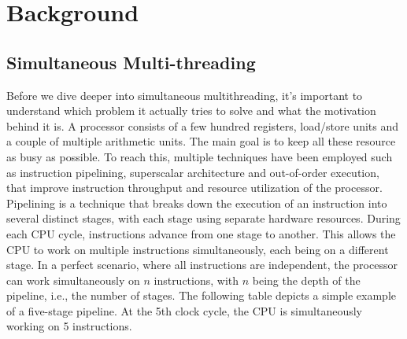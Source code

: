 \chapter{Background}\label{chapter:background}
\section{Simultaneous Multi-threading}
Before we dive deeper into simultaneous multithreading, it's important to understand which problem it actually 
tries to solve and what the motivation behind it is. 
A processor consists of a few hundred registers, load/store units and a couple of multiple arithmetic units. 
The main goal is to keep all these resource as busy as possible. To reach this, multiple techniques have been 
employed such as instruction pipelining, superscalar architecture and out-of-order execution, that improve 
instruction throughput and resource utilization of the processor.
Pipelining is a technique that breaks down the execution of an instruction into several distinct stages, 
with each stage using separate hardware resources. During each CPU cycle, instructions advance from one stage 
to another. This allows the CPU to work on multiple instructions simultaneously, each being on a different 
stage. In a perfect scenario, where all instructions are independent, the processor can work simultaneously 
on \begin{math}n\end{math} instructions, with \begin{math}n\end{math} being the depth of the pipeline, i.e., 
the number of stages. The following table depicts a simple example of a five-stage pipeline. 
At the 5th clock cycle, the CPU is simultaneously working on 5 instructions.  

